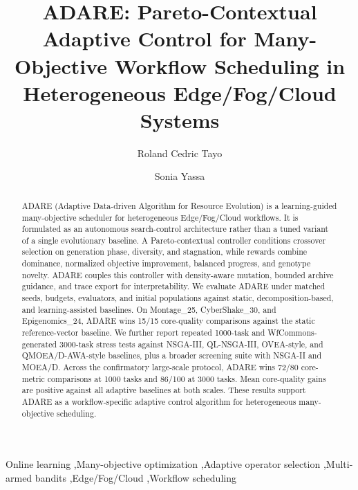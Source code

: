 \documentclass[preprint,12pt]{elsarticle}
\begin{document}
\begin{frontmatter}

\title{ADARE: Pareto-Contextual Adaptive Control for Many-Objective Workflow Scheduling in Heterogeneous Edge/Fog/Cloud Systems}

\author[cyu]{Roland Cedric Tayo}
\author[cyu]{Sonia Yassa}
\address[cyu]{CY Cergy Paris University, France}

\begin{abstract}
ADARE (Adaptive Data-driven Algorithm for Resource Evolution) is a learning-guided many-objective scheduler for heterogeneous Edge/Fog/Cloud workflows. It is formulated as an autonomous search-control architecture rather than a tuned variant of a single evolutionary baseline. A Pareto-contextual controller conditions crossover selection on generation phase, diversity, and stagnation, while rewards combine dominance, normalized objective improvement, balanced progress, and genotype novelty. ADARE couples this controller with density-aware mutation, bounded archive guidance, and trace export for interpretability. We evaluate ADARE under matched seeds, budgets, evaluators, and initial populations against static, decomposition-based, and learning-assisted baselines. On Montage\_25, CyberShake\_30, and Epigenomics\_24, ADARE wins 15/15 core-quality comparisons against the static reference-vector baseline. We further report repeated 1000-task and WfCommons-generated 3000-task stress tests against NSGA-III, QL-NSGA-III, OVEA-style, and QMOEA/D-AWA-style baselines, plus a broader screening suite with NSGA-II and MOEA/D. Across the confirmatory large-scale protocol, ADARE wins 72/80 core-metric comparisons at 1000 tasks and 86/100 at 3000 tasks. Mean core-quality gains are positive against all adaptive baselines at both scales. These results support ADARE as a workflow-specific adaptive control algorithm for heterogeneous many-objective scheduling.
\end{abstract}

\begin{keyword}
Online learning \sep Many-objective optimization \sep Adaptive operator selection \sep Multi-armed bandits \sep Edge/Fog/Cloud \sep Workflow scheduling
\end{keyword}

\end{frontmatter}
\end{document}
